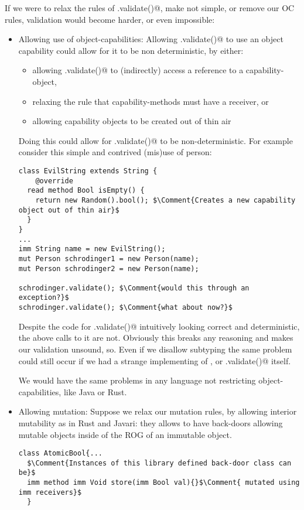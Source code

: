 If we were to relax the rules of \Q@.validate()@, make \Q@Person@ not simple, or remove our OC rules, validation would become harder, or even impossible:
\begin{itemize}


\item Allowing use of object-capabilities:
Allowing \Q@.validate()@ to use an object capability could allow for it to be non deterministic, by either:
\begin{itemize}
\item allowing \Q@.validate()@ to (indirectly) access a \Q@mut@ reference to a capability-object,
\item relaxing the rule that capability-methods must have a \Q@mut@ receiver, or
\item allowing capability objects to be created out of thin air
\end{itemize}

Doing this could allow for \Q@.validate()@ to be non-deterministic. For example consider this simple and contrived (mis)use of person:
\begin{lstlisting}
class EvilString extends String {
	@override
  read method Bool isEmpty() {
    return new Random().bool(); $\Comment{Creates a new capability object out of thin air}$
  }
}
...
imm String name = new EvilString();
mut Person schrodinger1 = new Person(name);
mut Person schrodinger2 = new Person(name);

schrodinger.validate(); $\Comment{would this through an exception?}$
schrodinger.validate(); $\Comment{what about now?}$
\end{lstlisting}
Despite the code for \Q@Persion.validate()@ intuitively looking correct and deterministic, the above calls to it are not. Obviously this breaks any reasoning and makes our validation unsound, so. Even if we disallow subtyping the same problem could still occur if we had a strange implementing of \Q@String@, or \Q@Persion.validate()@ itself.


We would have the same problems in any language not restricting object-capabilities, like Java or Rust.

\item Allowing mutation: %
Suppose we relax our mutation rules, by allowing interior mutability
as in Rust and Javari: they allows to have back-doors allowing mutable objects inside of 
the ROG of an immutable object.
\begin{lstlisting}
class AtomicBool{...
  $\Comment{Instances of this library defined back-door class can be}$
  imm method imm Void store(imm Bool val){}$\Comment{ mutated using imm receivers}$
  }


\end{lstlisting}
\end{itemize}

